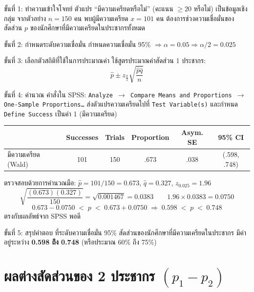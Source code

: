 \documentclass[10pt]{extarticle}
\newcommand{\spssout}[1]{\vspace{2pt}\noindent{\small\textbf{\textcolor{compfr}{Output -- #1}}}\par\vspace{1pt}}
\begin{document}
\begin{stepbox}{ขั้นที่ 1: ทำความเข้าใจโจทย์}
ตัวแปร ``มีความเครียดหรือไม่'' (คะแนน $\ge20$ หรือไม่) เป็นข้อมูลเชิงกลุ่ม จากตัวอย่าง $n=150$ คน พบผู้มีความเครียด $x=101$ คน ต้องการช่วงความเชื่อมั่นของสัดส่วน $p$ ของนักศึกษาที่มีความเครียดในประชากรทั้งหมด
\end{stepbox}

\begin{stepbox}{ขั้นที่ 2: กำหนดระดับความเชื่อมั่น}
กำหนดความเชื่อมั่น 95\% $\Rightarrow \alpha=0.05 \Rightarrow \alpha/2=0.025$
\end{stepbox}

\begin{stepbox}{ขั้นที่ 3: เลือกตัวสถิติที่ใช้ในการประมาณค่า}
ใช้สูตรประมาณค่าสัดส่วน 1 ประชากร:
$$\hat{p}\pm z_{\frac{\alpha}{2}}\sqrt{\frac{\hat{p}\hat{q}}{n}}$$
\end{stepbox}

\begin{stepbox}{ขั้นที่ 4: คำนวณ}
คำสั่งใน SPSS: \texttt{Analyze $\to$ Compare Means and Proportions $\to$ One-Sample Proportions\dots} ส่งตัวแปรความเครียดไปที่ \texttt{Test Variable(s)} และกำหนด \texttt{Define Success} เป็นค่า 1 (มีความเครียด)

\spssout{SPSS จากไฟล์ต้นฉบับ}
\begin{center}\small
\begin{tabular}{@{}lccccc@{}}
\toprule
& Successes & Trials & Proportion & Asym. SE & 95\% CI\\
\midrule
มีความเครียด (Wald) & 101 & 150 & .673 & .038 & (.598, .748)\\
\bottomrule
\end{tabular}
\end{center}
ตรวจสอบด้วยการคำนวณมือ: $\hat p=101/150=0.673$, $\hat q=0.327$, $z_{0.025}=1.96$
$$\sqrt{\frac{(0.673)(0.327)}{150}}=\sqrt{0.001467}=0.0383 \qquad 1.96\times0.0383=0.0750$$
$$0.673-0.0750 \;<\;p\;<\;0.673+0.0750 \;\Rightarrow\; 0.598 \;<\;p\;<\;0.748$$
ตรงกับผลลัพธ์จาก SPSS พอดี
\end{stepbox}

\begin{stepbox}{ขั้นที่ 5: สรุปคำตอบ}
ที่ระดับความเชื่อมั่น 95\% สัดส่วนของนักศึกษาที่มีความเครียดในประชากร มีค่าอยู่ระหว่าง \textbf{0.598 ถึง 0.748} (หรือประมาณ 60\% ถึง 75\%)
\end{stepbox}

\section{ผลต่างสัดส่วนของ 2 ประชากร $(p_1-p_2)$}
\end{document}
